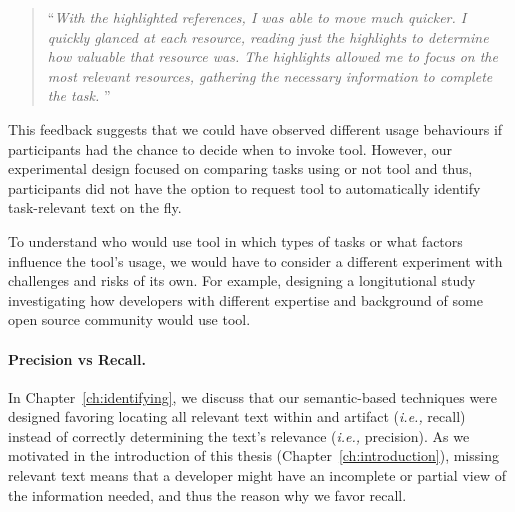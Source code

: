 \begin{footnotesize}
\begin{quote}
    ``\textit{With the highlighted references, I was able to move much quicker. I quickly glanced at each resource, reading just the highlights to determine how valuable that resource was. The highlights allowed me to focus on the most relevant resources, gathering the necessary information to complete the task. 
}''
\end{quote}
\end{footnotesize}





\smallskip
This feedback suggests that we could have observed different usage behaviours if participants had the chance to decide when to invoke \acs{tool}.
However, 
our experimental design focused on comparing tasks using or not \acs{tool} and thus, participants did not have the option to 
request \acs{tool} to automatically identify task-relevant text on the fly. 


To understand who would use  \acs{tool} in which types of tasks or 
what factors  influence the tool's usage,
we would have to consider a different experiment with challenges and risks of its own.
For example, designing a longitutional study investigating how developers 
with different expertise and background
of some open source community would use \acs{tool}.







\paragraph{\textbf{Precision vs Recall.}}

In Chapter~\ref{ch:identifying}, we discuss that our semantic-based techniques were designed favoring locating all relevant text within and
artifact (\textit{i.e.,} recall) instead of 
correctly determining the text's relevance (\textit{i.e.,} precision). 
As we motivated in the introduction of this thesis (Chapter~\ref{ch:introduction}),
missing relevant text means that a developer might have an incomplete or partial view of the information needed,
and thus the reason why we favor recall. 


